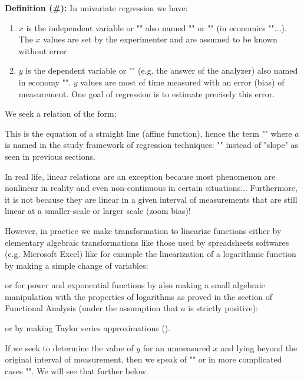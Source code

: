 	\textbf{Definition (\#\mydef):} In univariate regression we have:
	\begin{enumerate}
		\item $x$ is the independent variable or "" also named "" or "" (in economics ""...). The $x$ values are set by the experimenter and are assumed to be known without error.
		
		\item $y$ is the dependent variable or "" (e.g. the answer of the analyzer) also named in economy "". $y$ values are most of time measured with an error (bias) of measurement. One goal of regression is to estimate precisely this error.
	\end{enumerate}
	We seek a relation of the form:
	
	This is the equation of a straight line (affine function), hence the term "" where $a$ is named in the study framework of regression techniques: "" instead of "slope" as seen in previous sections.
	
	In real life, linear relations are an exception because most phenomenon are nonlinear in reality and even non-continuous in certain situations... Furthermore, it is not because they are linear in a given interval of measurements that are still linear at a smaller-scale or larger scale (zoom bias)!
	
	However, in practice we make transformation to linearize functions either by elementary algebraic transformations like those used by spreadsheets softwares (e.g. Microsoft Excel) like for example the linearization of a logarithmic function by making a simple change of variables:
	
	or for power and exponential functions by also making a small algebraic manipulation with the properties of logarithms as proved in the section of Functional Analysis (under the assumption that $a$ is strictly positive)\label{logarithmic and exponential linearization}:
	
	or by making Taylor series approximations ().
	
	\begin{tcolorbox}[title=Remark,colframe=black,arc=10pt]
	If we seek to determine the value of $y$ for an unmeasured $x$ and lying beyond the original interval of measurement, then we speak of "" or in more complicated cases "". We will see that further below.
	\end{tcolorbox}	
	
